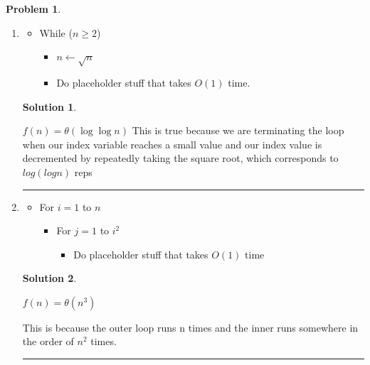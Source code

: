 \documentclass{article}
\theoremstyle{definition}
\newtheorem{problem}{Problem}
\def\fline{\rule{0.75\linewidth}{0.5pt}}
\newcommand{\finishline}{
  \begin{center}\fline
\end{center}}
\newtheorem*{solution*}{Solution}
\newenvironment{solution}{
\begin{solution*}}{{\finishline}
\end{solution*}}
\begin{document}
\begin{problem}
\begin{enumerate}[label =\alph*)]
      \item
        \begin{itemize}
          \item While ($n \geq 2$)
            \begin{itemize}
              \item $n \gets \sqrt{n}$
              \item Do placeholder stuff that takes $O(1)$ time.
            \end{itemize}
        \end{itemize}

        \begin{solution}
          \

          $f(n) = \theta(\log\log n)$ This is true because we are terminating the loop when our index variable reaches a small value and our index value is decremented by repeatedly taking the square root, which corresponds to $log(log n)$ reps
        \end{solution}

      \item

        \begin{itemize}
          \item For $i = 1$ to $n$
            \begin{itemize}
              \item For $j = 1$ to $i^2$
                \begin{itemize}
                  \item Do placeholder stuff that takes $O(1)$ time
                \end{itemize}
            \end{itemize}
        \end{itemize}
        \begin{solution}
          \

          $f(n) = \theta(n^3)$

          This is because the outer loop runs n times and the inner runs somewhere in the order of $n^2$ times.
        \end{solution}


\end{enumerate}
\end{problem}
\end{document}

